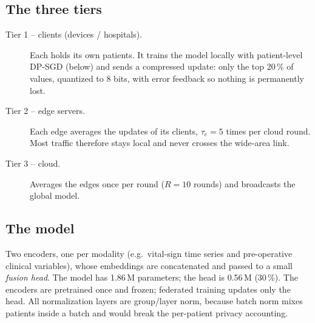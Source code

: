 \documentclass[11pt,a4paper]{article}
\begin{document}
\subsection{The three tiers}
\begin{description}
\item[Tier 1 -- clients (devices / hospitals).] Each holds its own patients.
It trains the model locally with patient-level DP-SGD (below) and sends a
compressed update: only the top 20\,\% of values, quantized to 8 bits, with
error feedback so nothing is permanently lost.
\item[Tier 2 -- edge servers.] Each edge averages the updates of its clients,
$\tau_e = 5$ times per cloud round. Most traffic therefore stays local and
never crosses the wide-area link.
\item[Tier 3 -- cloud.] Averages the edges once per round ($R = 10$ rounds)
and broadcasts the global model.
\end{description}

\subsection{The model}
Two encoders, one per modality (e.g.\ vital-sign time series and pre-operative
clinical variables), whose embeddings are concatenated and passed to a small
\emph{fusion head}. The model has 1.86\,M parameters; the head is 0.56\,M
(30\,\%). The encoders are pretrained once and frozen; federated training
updates only the head. All normalization layers are group/layer norm, because
batch norm mixes patients inside a batch and would break the per-patient
privacy accounting.
\end{document}
